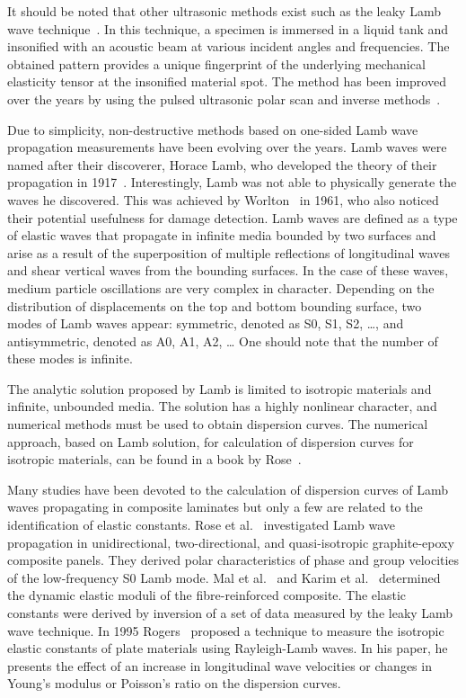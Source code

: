 \documentclass[preprint,12pt]{elsarticle}
\begin{document}
	 It should be noted that other ultrasonic methods exist such as the leaky Lamb wave technique~\cite{Karim1990,Karim1990a}. In this technique, a specimen is immersed in a liquid tank and insonified with an acoustic beam at various incident angles and frequencies. The obtained pattern provides a unique fingerprint of the underlying mechanical elasticity tensor at the insonified material spot. The method has been improved over the years by using the pulsed ultrasonic polar scan and inverse methods~\cite{Martens2017,Kersemans2014,Martens2019a}. 
	 
	 Due to simplicity, non-destructive methods based on one-sided Lamb wave propagation measurements have been evolving over the years.
	Lamb waves were named after their discoverer, Horace Lamb, who developed the theory of their propagation in 1917~\cite{Lamb1917}. Interestingly, Lamb was not able to physically generate the waves he discovered. This was achieved by Worlton~\cite{Worlton1961} in 1961, who also noticed their potential usefulness for damage detection. Lamb waves are defined as a type of elastic waves that propagate in infinite media bounded by two surfaces and arise as a result of the superposition of multiple reflections of longitudinal waves and shear vertical waves from the bounding surfaces. In the case of these waves, medium particle oscillations are very complex in character. Depending on the distribution of displacements on the top and bottom bounding surface, two modes of Lamb waves appear: symmetric, denoted as S0, S1, S2, …, and antisymmetric, denoted as A0, A1, A2, … One should note that the number of these modes is infinite.
	
	The analytic solution proposed by Lamb is limited to isotropic materials and infinite, unbounded media. The solution has a highly nonlinear character, and numerical methods must be used to obtain dispersion curves. The numerical approach, based on Lamb solution, for calculation of dispersion curves for isotropic materials, can be found in a book by Rose~\cite{Rose1999}.
	
	Many studies have been devoted to the calculation of dispersion curves of Lamb waves propagating in composite laminates but only a few are related to the identification of elastic constants. Rose et al.~\cite{Rose1987} investigated Lamb wave propagation in unidirectional, two-directional, and quasi-isotropic graphite-epoxy composite panels. They derived polar characteristics of phase and group velocities of the low-frequency S0 Lamb mode. Mal et al.~\cite{Mal1993} and Karim et al.~\cite{Karim1990} determined the dynamic elastic moduli of the fibre-reinforced composite. The elastic constants were derived by inversion of a set of data measured by the leaky Lamb wave technique. In 1995 Rogers~\cite{Rogers1995} proposed a technique to measure the isotropic elastic constants of plate materials using Rayleigh-Lamb waves. In his paper, he presents the effect of an increase in longitudinal wave velocities or changes in Young’s modulus or Poisson’s ratio on the dispersion curves.
	
\end{document}
